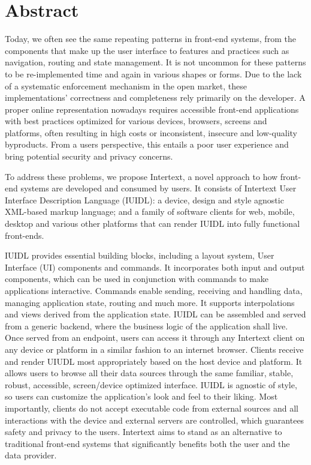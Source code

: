 

\section*{Abstract}

Today, we often see the same repeating patterns in front-end systems, from the components that make up the user interface to features and practices such as navigation, routing and state management. It is not uncommon for these patterns to be re-implemented time and again in various shapes or forms. Due to the lack of a systematic enforcement mechanism in the open market, these implementations' correctness and completeness rely primarily on the developer. A proper online representation nowadays requires accessible front-end applications with best practices optimized for various devices, browsers, screens and platforms, often resulting in high costs or inconsistent, insecure and low-quality byproducts. From a users perspective, this entails a poor user experience and bring potential security and privacy concerns. 

To address these problems, we propose Intertext, a novel approach to how front-end systems are developed and consumed by users. It consists of Intertext User Interface Description Language (IUIDL): a device, design and style agnostic XML-based markup language; and a family of software clients for web, mobile, desktop and various other platforms that can render IUIDL into fully functional front-ends.

IUIDL provides essential building blocks, including a layout system, User Interface (UI) components and commands. It incorporates both input and output components, which can be used in conjunction with commands to make applications interactive. Commands enable sending, receiving and handling data, managing application state, routing and much more. It supports interpolations and views derived from the application state. IUIDL can be assembled and served from a generic backend, where the business logic of the application shall live. Once served from an endpoint, users can access it through any Intertext client on any device or platform in a similar fashion to an internet browser. Clients receive and render UIUDL most appropriately based on the host device and platform. It allows users to browse all their data sources through the same familiar, stable, robust, accessible, screen/device optimized interface. IUIDL is agnostic of style, so users can customize the application's look and feel to their liking. Most importantly, clients do not accept executable code from external sources and all interactions with the device and external servers are controlled, which guarantees safety and privacy to the users. Intertext aims to stand as an alternative to traditional front-end systems that significantly benefits both the user and the data provider.